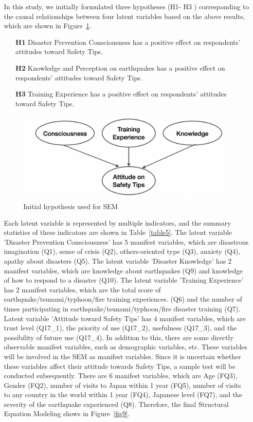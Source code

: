 In this study, we initially formulated three hypotheses (H1- H3 ) corresponding to the causal relationships between four latent variables based on the above results, which are shown in Figure~\ref{fig30}.

\begin{itemize}
\item[\textbf{H1}] Disaster Prevention Consciousness has a positive effect on respondents' attitudes toward Safety Tips.
\item[\textbf{H2}] Knowledge and Perception on earthquakes has a positive effect on respondents' attitudes toward Safety Tips.
\item[\textbf{H3}] Training Experience has a positive effect on respondents' attitudes toward Safety Tips.
\end{itemize}

\begin{figure}[h]
  \includegraphics[width=0.5\linewidth]{Figure/Figure30.jpg}
  \centering
  \caption{Initial hypothesis used for SEM}
  \label{fig30}
\end{figure}

Each latent variable is represented by multiple indicators, and the summary statistics of these indicators are shown in Table~\ref{table5}. The latent variable 'Disaster Prevention Consciousness' has 5 manifest variables, which are disastrous imagination (Q1), sense of crisis (Q2), others-oriented type (Q3), anxiety (Q4), apathy about disasters (Q5). The latent variable 'Disaster Knowledge' has 2 manifest variables, which are knowledge about earthquakes (Q9) and knowledge of how to respond to a disaster (Q10). The latent variable 'Training Experience' has 2 manifest variables, which are the total score of earthquake/tsunami/typhoon/fire training experiences. (Q6) and the number of times participating in earthquake/tsunami/typhoon/fire disaster training (Q7). Latent variable 'Attitude toward Safety Tips' has 4 manifest variables, which are trust level (Q17\_1), the priority of use (Q17\_2), usefulness (Q17\_3), and the possibility of future use (Q17\_4). In addition to this, there are some directly observable manifest variables, such as demographic variables, etc. These variables will be involved in the SEM as manifest variables. Since it is uncertain whether these variables affect their attitude towards Safety Tips, a sample test will be conducted subsequently. There are 6 manifest variables, which are Age (FQ3), Gender (FQ2), number of visits to Japan within 1 year (FQ5), number of visits to any country in the world within 1 year (FQ4), Japanese level (FQ7), and the severity of the earthquake experienced (Q8). Therefore, the final Structural Equation Modeling shows in Figure~\ref{fig9}.

